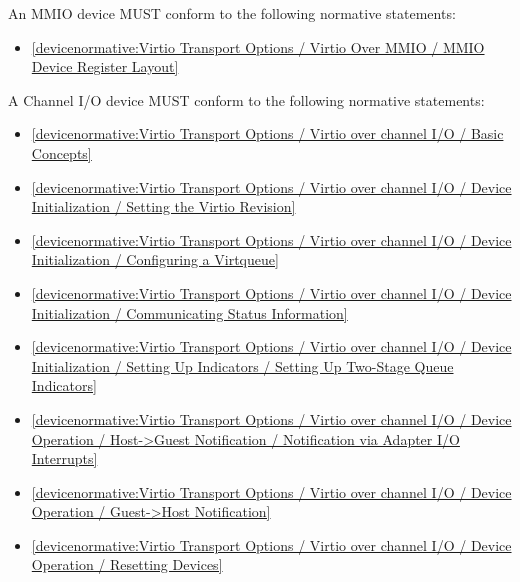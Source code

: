 An MMIO device MUST conform to the following normative statements:

\begin{itemize}
\item \ref{devicenormative:Virtio Transport Options / Virtio Over MMIO / MMIO Device Register Layout}
\end{itemize}

\label{sec:Conformance / Device Conformance / Channel I/O Device Conformance}

A Channel I/O device MUST conform to the following normative statements:

\begin{itemize}
\item \ref{devicenormative:Virtio Transport Options / Virtio over channel I/O / Basic Concepts}
\item \ref{devicenormative:Virtio Transport Options / Virtio over channel I/O / Device Initialization / Setting the Virtio Revision}
\item \ref{devicenormative:Virtio Transport Options / Virtio over channel I/O / Device Initialization / Configuring a Virtqueue}
\item \ref{devicenormative:Virtio Transport Options / Virtio over channel I/O / Device Initialization / Communicating Status Information}
\item \ref{devicenormative:Virtio Transport Options / Virtio over channel I/O / Device Initialization / Setting Up Indicators / Setting Up Two-Stage Queue Indicators}
\item \ref{devicenormative:Virtio Transport Options / Virtio over channel I/O / Device Operation / Host->Guest Notification / Notification via Adapter I/O Interrupts}
\item \ref{devicenormative:Virtio Transport Options / Virtio over channel I/O / Device Operation / Guest->Host Notification}
\item \ref{devicenormative:Virtio Transport Options / Virtio over channel I/O / Device Operation / Resetting Devices}
\end{itemize}

\label{sec:Conformance / Device Conformance / Network Device Conformance}

